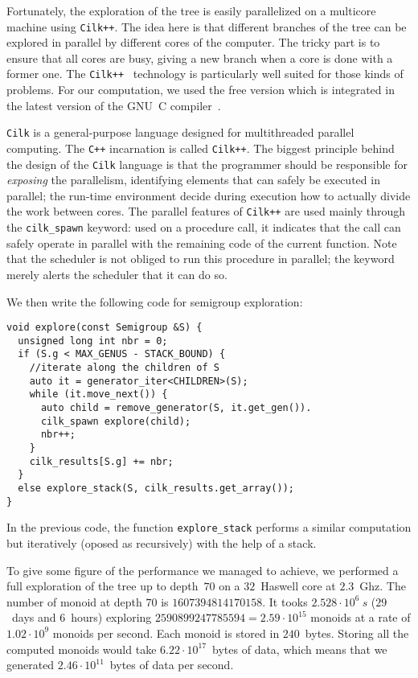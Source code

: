 \documentclass{deliverablereport}
\newcommand{\Cilk}{\texttt{Cilk}\xspace}
\newcommand{\CilkP}{\texttt{Cilk++}\xspace}
\newcommand{\CPP}{\texttt{C++}\xspace}
\begin{document}
Fortunately, the exploration of the tree is easily parallelized on a multicore
machine using \CilkP. The idea here is that different branches of the tree
can be explored in parallel by different cores of the computer. The tricky
part is to ensure that all cores are busy, giving a new branch when a core is
done with a former one. The \CilkP~\cite{CilkIntel} technology is
particularly well suited for those kinds of problems. For our computation, we
used the free version which is integrated in the latest version of the GNU~C
compiler~\cite{GCCcilk}.

\Cilk is a general-purpose language designed for multithreaded parallel
computing. The \CPP incarnation is called \CilkP. The biggest principle behind
the design of the \Cilk language is that the programmer should be responsible
for \emph{exposing} the parallelism, identifying elements that can safely be
executed in parallel; the run-time environment decide during execution how to
actually divide the work between cores. The parallel features of \CilkP are
used mainly through the \texttt{cilk\_spawn} keyword: used on a procedure
call, it indicates that the call can safely operate in parallel with the
remaining code of the current function. Note that the scheduler is not obliged
to run this procedure in parallel; the keyword merely alerts the scheduler
that it can do so.

We then write the following code for semigroup exploration:
\begin{verbatim}
void explore(const Semigroup &S) {
  unsigned long int nbr = 0;
  if (S.g < MAX_GENUS - STACK_BOUND) {
    //iterate along the children of S
    auto it = generator_iter<CHILDREN>(S); 
    while (it.move_next()) {
      auto child = remove_generator(S, it.get_gen()).
      cilk_spawn explore(child);
      nbr++;
    }
    cilk_results[S.g] += nbr;
  }
  else explore_stack(S, cilk_results.get_array());
}
\end{verbatim}
In the previous code, the function \verb+explore_stack+ performs a similar
computation but iteratively (oposed as recursively) with the help of a stack.

To give some figure of the performance we managed to achieve, we performed
a full exploration of the tree up to depth~$70$ on a $32$~Haswell core at
$2.3$~Ghz. The number of monoid at depth $70$ is $1607394814170158$.  It tooks
$2.528\cdot10^{6}~s$ ($29$~days and $6$~hours) exploring
$2590899247785594=2.59\cdot10^{15}$ monoids at a rate of $1.02\cdot10^{9}$
monoids per second. Each monoid is stored in $240$~bytes. Storing all the
computed monoids would take $6.22\cdot10^{17}$~bytes of data, which means that
we generated $2.46\cdot10^{11}$~bytes of data per second.
\end{document}
